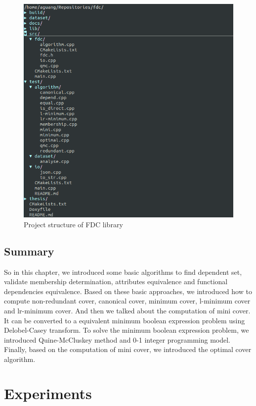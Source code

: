 \documentclass[11pt]{book}
\begin{document}
\begin{figure}
	\centering
	\includegraphics[width=\textwidth]{./diagrams/structure.png}
	\caption{Project structure of FDC library}
\end{figure}

\section{Summary}

So in this chapter, we introduced some basic algorithms to find dependent set, validate membership determination, attributes equivalence and functional dependencies equivalence. Based on these basic approaches, we introduced how to compute non-redundant cover, canonical cover, minimum cover, l-minimum cover and lr-minimum cover. And then we talked about the computation of mini cover. It can be converted to a equivalent minimum boolean expression problem using Delobel-Casey transform. To solve the minimum boolean expression problem, we introduced Quine-McCluskey method and 0-1 integer programming model. Finally, based on the computation of mini cover, we introduced the optimal cover algorithm.

\chapter{Experiments}
\end{document}
